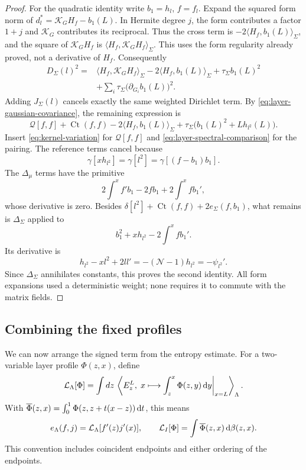 \begin{proof}
For the quadratic identity write $b_1=h_l$, $f=f_l$. Expand the squared form norm of $d_l^*=\mathcal{K}_GH_f-b_1(L)$. In Hermite degree $j$, the form contributes a factor $1+j$ and $\mathcal{K}_G$ contributes its reciprocal. Thus the cross term is $-2\langle H_f,b_1(L)\rangle_\Sigma$, and the square of $\mathcal{K}_GH_f$ is $\langle H_f,\mathcal{K}_GH_f\rangle_\Sigma$. This uses the form regularity already proved, not a derivative of $H_f$. Consequently
\[
 \begin{split}
 D_\Sigma(l)^2
  ={}&\langle H_f,\mathcal{K}_GH_f\rangle_\Sigma
       -2\langle H_f,b_1(L)\rangle_\Sigma
       +\tau_\Sigma b_1(L)^2\\
     &+\sum_i\tau_\Sigma
                    \bigl(\partial_{G_i}b_1(L)\bigr)^2 .
 \end{split}
\]
Adding $J_\Sigma(l)$ cancels exactly the same weighted Dirichlet term. By \eqref{eq:layer-gaussian-covariance}, the remaining expression is
\[
 \mathcal{Q}[f,f]+\operatorname{Ct}(f,f)
   -2\langle H_f,b_1(L)\rangle_\Sigma
   +\tau_\Sigma\bigl(b_1(L)^2+Lh_{l^2}(L)\bigr).
\]
Insert \eqref{eq:kernel-variation} for $\mathcal{Q}[f,f]$ and \eqref{eq:layer-spectral-comparison} for the pairing. The reference terms cancel because
\[
 \gamma[xh_{l^2}]=\gamma[l^2]
    =\gamma[(f-b_1)b_1].
\]
The $\Delta_\mu$ terms have the primitive
\[
 2\int^x f'b_1-2fb_1+2\int^x fb_1',
\]
whose derivative is zero. Besides $\delta[l^2]+\operatorname{Ct}(f,f)+2e_\Sigma(f,b_1)$, what remains is $\Delta_\Sigma$ applied to
\[
 b_1^2+xh_{l^2}-2\int^x fb_1'.
\]
Its derivative is
\[
 h_{l^2}-x l^2+2ll'
    =-(\mathcal{N}-1)h_{l^2}=-\psi_{l^2}'.
\]
Since $\Delta_\Sigma$ annihilates constants, this proves the second identity. All form expansions used a deterministic weight; none requires it to commute with the matrix fields.
\end{proof}

\subsection{Combining the fixed profiles}

We can now arrange the signed term from the entropy estimate. For a two-variable layer profile $\Phi(z,x)$, define
\[
 \mathcal{L}_\Lambda[\Phi]
  =\int dz\,
    \left\langle E_z^L,\,
       \left.x\longmapsto\int_z^x\Phi(z,y)\,\mathrm{d} y\right|_{x=L}
    \right\rangle_\Lambda .
\]
With $\overline\Phi(z,x)=\int_0^1\Phi(z,z+t(x-z))\,\mathrm{d} t$, this means
\[
 e_\Lambda(f,j)=\mathcal{L}_\Lambda[f'(z)j'(x)],
 \qquad
 \mathcal{L}_I[\Phi]=\int\overline\Phi(z,x)\,\mathrm{d} \beta(z,x).
\]
This convention includes coincident endpoints and either ordering of the endpoints.


